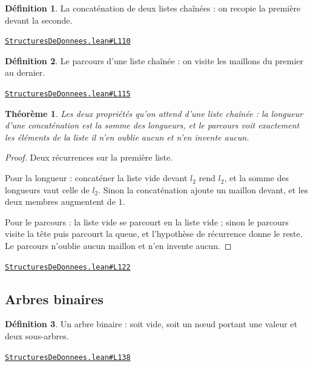 \documentclass[11pt,a4paper]{article}
\theoremstyle{definition}
\newtheorem{definition}{Définition}
\theoremstyle{plain}
\newtheorem{theoreme}{Théorème}
\newcommand{\source}[2]{\par\smallskip\noindent\hfill{\footnotesize\href{#1}{\texttt{#2}}}\par\smallskip}
\begin{document}
\begin{definition}
La concaténation de deux listes chaînées : on recopie la première devant la
seconde.
\end{definition}
\source{https://github.com/Commutator-IO/learn-lean/blob/main/courses/02-lycee/11-informatique-nsi/StructuresDeDonnees.lean\#L110}{StructuresDeDonnees.lean\#L110}

\begin{definition}
Le parcours d'une liste chaînée : on visite les maillons du premier au dernier.
\end{definition}
\source{https://github.com/Commutator-IO/learn-lean/blob/main/courses/02-lycee/11-informatique-nsi/StructuresDeDonnees.lean\#L115}{StructuresDeDonnees.lean\#L115}

\begin{theoreme}
Les deux propriétés qu'on attend d'une liste chaînée : la longueur d'une
concaténation est la somme des longueurs, et le parcours voit exactement les éléments
de la liste \textemdash{} il n'en oublie aucun et n'en invente aucun.
\end{theoreme}
\begin{proof}
Deux récurrences sur la première liste.

Pour la longueur : concaténer la liste vide devant \(l_2\) rend \(l_2\), et la somme des
longueurs vaut celle de \(l_2\). Sinon la concaténation ajoute un maillon devant, et les
deux membres augmentent de \(1\).

Pour le parcours : la liste vide se parcourt en la liste vide ; sinon le parcours visite
la tête puis parcourt la queue, et l'hypothèse de récurrence donne le reste. Le parcours
n'oublie aucun maillon et n'en invente aucun.
\end{proof}
\source{https://github.com/Commutator-IO/learn-lean/blob/main/courses/02-lycee/11-informatique-nsi/StructuresDeDonnees.lean\#L122}{StructuresDeDonnees.lean\#L122}

\subsection{Arbres binaires}

\begin{definition}
Un arbre binaire : soit vide, soit un nœud portant une valeur et deux
sous-arbres.
\end{definition}
\source{https://github.com/Commutator-IO/learn-lean/blob/main/courses/02-lycee/11-informatique-nsi/StructuresDeDonnees.lean\#L138}{StructuresDeDonnees.lean\#L138}
\end{document}
